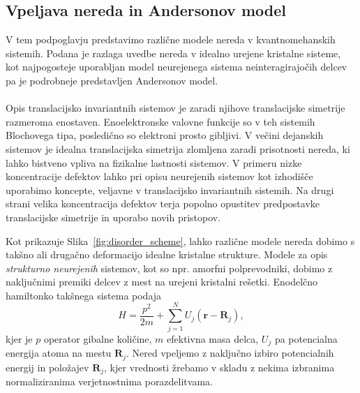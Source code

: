 \subsection{Vpeljava nereda in Andersonov model}
V tem podpoglavju predstavimo različne modele nereda v kvantnomehanskih sistemih. Podana je razlaga uvedbe nereda v idealno urejene kristalne sisteme, kot najpogosteje uporabljan model neurejenega sistema neinteragirajočih delcev pa je podrobneje predstavljen Andersonov model. \\\\
Opis translacijsko invariantnih sistemov je zaradi njihove translacijske simetrije razmeroma enostaven. Enoelektronske valovne funkcije so v teh sistemih Blochovega tipa, posledično so elektroni prosto gibljivi. V večini dejanskih sistemov je idealna translacijska simetrija zlomljena zaradi prisotnosti nereda, ki lahko bistveno vpliva na fizikalne lastnosti sistemov. V primeru nizke koncentracije defektov lahko pri opisu neurejenih sistemov kot izhodišče uporabimo koncepte, veljavne v translacijsko invariantnih sistemih. Na drugi strani velika koncentracija defektov terja popolno opustitev predpostavke translacijske simetrije in uporabo novih pristopov. \newpage
\noindent
\begin{minipage}[t]{0.54\textwidth}
Kot prikazuje Slika~\ref{fig:disorder_scheme}, lahko različne modele nereda dobimo s takšno ali drugačno deformacijo idealne kristalne strukture. Modele za opis \emph{strukturno neurejenih} sistemov, kot so npr. amorfni polprevodniki,  dobimo z naključnimi premiki delcev z mest na urejeni kristalni rešetki. Enodelčno hamiltonko takšnega sistema podaja 
\begin{equation}\label{eq:cont_ham}
H=\frac{p^2}{2m} + \sum\limits_{j=1}^N U_j(\textbf{r}- \textbf{R}_j), 
\end{equation}
kjer je $p$ operator gibalne količine, $m$ efektivna masa delca, $U_j$ pa potencialna energija atoma na mestu $\textbf{R}_j$. Nered vpeljemo z naključno izbiro potencialnih energij in položajev $\textbf{R}_j$, kjer vrednosti žrebamo v skladu z nekima izbranima normaliziranima verjetnostnima porazdelitvama. \\\\
\end{minipage}\hfill
